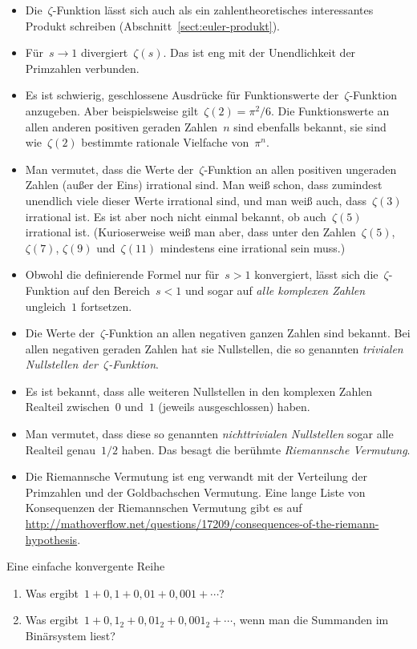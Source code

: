 \documentclass[twoside]{../zirkelblatt1415}
\theoremstyle{definition}
\theoremstyle{plain}
\theoremstyle{remark}
\begin{document}
\begin{itemize}
\item Die~$\zeta$-Funktion lässt sich auch als ein zahlentheoretisches
interessantes Produkt schreiben (Abschnitt~\ref{sect:euler-produkt}).
\item Für~$s \to 1$ divergiert~$\zeta(s)$. Das ist eng mit der Unendlichkeit
der Primzahlen verbunden.
\item Es ist schwierig, geschlossene Ausdrücke für Funktionswerte
der~$\zeta$-Funktion anzugeben. Aber beispielsweise gilt~$\zeta(2) = \pi^2/6$.
Die Funktionswerte an allen anderen positiven geraden Zahlen~$n$ sind ebenfalls
bekannt, sie sind wie~$\zeta(2)$ bestimmte rationale Vielfache von~$\pi^n$.
\item Man vermutet, dass die Werte der~$\zeta$-Funktion an allen positiven
ungeraden Zahlen (außer der Eins) irrational sind. Man weiß schon, dass zumindest unendlich
viele dieser Werte irrational sind, und man weiß auch, dass~$\zeta(3)$
irrational ist. Es ist aber noch nicht einmal bekannt, ob auch~$\zeta(5)$ irrational
ist. (Kurioserweise weiß man aber, dass unter den Zahlen~$\zeta(5)$,
$\zeta(7)$, $\zeta(9)$ und~$\zeta(11)$ mindestens eine irrational sein muss.)
\item Obwohl die definierende Formel nur für~$s > 1$ konvergiert, lässt sich
die~$\zeta$-Funktion auf den Bereich~$s < 1$ und sogar auf \emph{alle komplexen
Zahlen} ungleich~$1$ fortsetzen.
\item Die Werte der~$\zeta$-Funktion an allen negativen ganzen Zahlen sind
bekannt. Bei allen negativen geraden Zahlen hat sie Nullstellen, die so
genannten \emph{trivialen Nullstellen der~$\zeta$-Funktion}.
\item Es ist bekannt, dass alle weiteren Nullstellen in den komplexen Zahlen
Realteil zwischen~$0$ und~$1$ (jeweils ausgeschlossen) haben.
\item Man vermutet, dass diese so genannten \emph{nichttrivialen Nullstellen}
sogar alle Realteil genau~$1/2$ haben. Das besagt die berühmte \emph{Riemannsche
Vermutung}.
\item Die Riemannsche Vermutung ist eng verwandt mit der Verteilung der
Primzahlen und der Goldbachschen Vermutung. Eine lange Liste von Konsequenzen
der Riemannschen Vermutung gibt es auf
\url{http://mathoverflow.net/questions/17209/consequences-of-the-riemann-hypothesis}.
\end{itemize}

\begin{aufgabe}{Eine einfache konvergente Reihe}\label{aufg:konvergente-reihen}
\begin{enumerate}
\item Was ergibt~$1 + 0{,}1 + 0{,}01 + 0{,}001 + \cdots$?
\item Was ergibt~$1 + 0{,}1_2 + 0{,}01_2 + 0{,}001_2 + \cdots$, wenn man die
Summanden im Binärsystem liest?
\end{enumerate}\fixlistspacing
\end{aufgabe}
\end{document}
